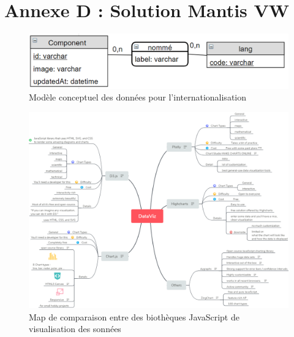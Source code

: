 \setcounter{figure}{0} 
\setcounter{table}{0}
\setcounter{footnote}{0}
\setcounter{equation}{0}
\pagestyle{fancy}
\fancyhf{}
\renewcommand{\chaptermark}[1]{\markboth{\MakeUppercase{#1 }}{}}
\renewcommand{\sectionmark}[1]{\markright{\thesection~ #1}}
\fancyhead[RO]{\bfseries\rightmark}
\fancyhead[LE]{\bfseries\leftmark}
\fancyfoot[RO]{\thepage}
\fancyfoot[LE]{\thepage}
\renewcommand{\headrulewidth}{0.5pt}
\renewcommand{\footrulewidth}{0pt}

\makeatletter
\renewcommand\thefigure{D.\arabic{figure}}
\renewcommand\thetable{D.\arabic{table}} 
\makeatother

\chapter{Annexe D : Solution Mantis VW}
\graphicspath{{Annexe4/figures/}}


\begin{figure}[!ht]\centering
\includegraphics[scale=0.15]{mcd2.png}
\caption{Modèle conceptuel des données pour l'internationalisation}
\label{fig:fig1}
\end{figure}
\FloatBarrier
\begin{figure}[!ht]\centering
\includegraphics[scale=0.4]{DataViz.png}
\caption{Map de comparaison entre des biothèques JavaScript de visualisation des sonnées}
\label{fig:fig1}
\end{figure}
\FloatBarrier

